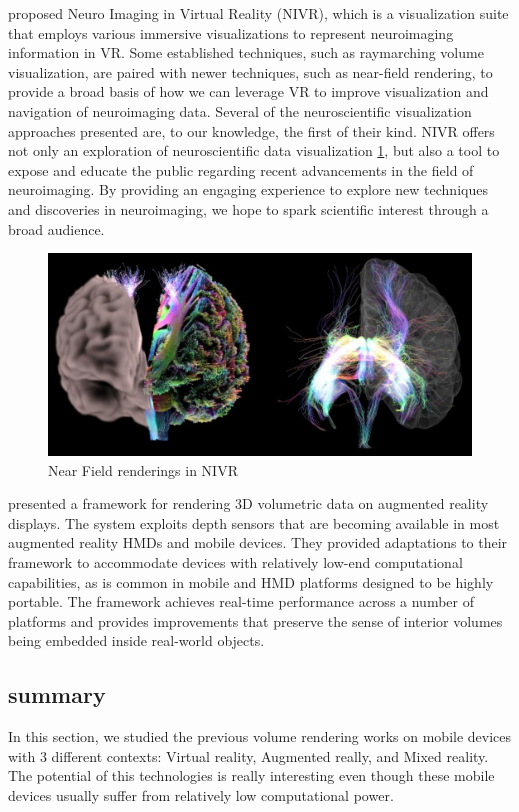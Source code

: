 \cite{7892381} proposed Neuro Imaging in Virtual Reality (NIVR), which is a visualization
suite that employs various immersive visualizations to represent
neuroimaging information in VR. Some established techniques,
such as raymarching volume visualization, are paired with newer
techniques, such as near-field rendering, to provide a broad basis
of how we can leverage VR to improve visualization and
navigation of neuroimaging data. Several of the neuroscientific
visualization approaches presented are, to our knowledge, the first
of their kind.
NIVR offers not only an exploration of neuroscientific data
visualization \ref{fig:nivr}, but also a tool to expose and educate the public
regarding recent advancements in the field of neuroimaging. By
providing an engaging experience to explore new techniques and
discoveries in neuroimaging, we hope to spark scientific interest
through a broad audience. 
\begin{figure}[th]
\centering
\includegraphics[width=\textwidth]{Figures/NIVR}
\decoRule
\caption[ NIVR]{ Near Field renderings in NIVR}
\label{fig:nivr}
\end{figure}



\cite{7938241} presented a framework for rendering 3D volumetric data
on augmented reality displays. The system exploits depth
sensors that are becoming available in most augmented reality
HMDs and mobile devices. They provided adaptations to their
framework to accommodate devices with relatively low-end
computational capabilities, as is common in mobile and HMD
platforms designed to be highly portable. The framework
achieves real-time performance across a number of platforms
and provides improvements that preserve the sense of interior
volumes being embedded inside real-world objects. 

\subsection{summary}
In this section, we studied the previous volume rendering works on mobile devices with 3 different contexts: Virtual reality, Augmented really, and Mixed reality. The potential of this technologies is really interesting even though these mobile devices usually suffer from relatively low computational power.   

